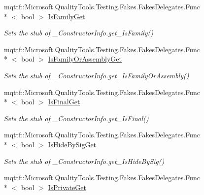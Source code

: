 \begin{DoxyCompactItemize}
mqttf\-::\-Microsoft.\-Quality\-Tools.\-Testing.\-Fakes.\-Fakes\-Delegates.\-Func\\*
$<$ bool $>$ \hyperlink{class_system_1_1_runtime_1_1_interop_services_1_1_fakes_1_1_stub___constructor_info_a9ee0365563e0af17c1c1f814badfc88d}{Is\-Family\-Get}
\begin{DoxyCompactList}\small\item\em Sets the stub of \-\_\-\-Constructor\-Info.\-get\-\_\-\-Is\-Family()\end{DoxyCompactList}\item 
mqttf\-::\-Microsoft.\-Quality\-Tools.\-Testing.\-Fakes.\-Fakes\-Delegates.\-Func\\*
$<$ bool $>$ \hyperlink{class_system_1_1_runtime_1_1_interop_services_1_1_fakes_1_1_stub___constructor_info_a1976c04db3bc42e131c55033d046c274}{Is\-Family\-Or\-Assembly\-Get}
\begin{DoxyCompactList}\small\item\em Sets the stub of \-\_\-\-Constructor\-Info.\-get\-\_\-\-Is\-Family\-Or\-Assembly()\end{DoxyCompactList}\item 
mqttf\-::\-Microsoft.\-Quality\-Tools.\-Testing.\-Fakes.\-Fakes\-Delegates.\-Func\\*
$<$ bool $>$ \hyperlink{class_system_1_1_runtime_1_1_interop_services_1_1_fakes_1_1_stub___constructor_info_a906f0c6c1a33694caf38fce03b3dd7f6}{Is\-Final\-Get}
\begin{DoxyCompactList}\small\item\em Sets the stub of \-\_\-\-Constructor\-Info.\-get\-\_\-\-Is\-Final()\end{DoxyCompactList}\item 
mqttf\-::\-Microsoft.\-Quality\-Tools.\-Testing.\-Fakes.\-Fakes\-Delegates.\-Func\\*
$<$ bool $>$ \hyperlink{class_system_1_1_runtime_1_1_interop_services_1_1_fakes_1_1_stub___constructor_info_a28e129ec0d4184141375fbabac96b86f}{Is\-Hide\-By\-Sig\-Get}
\begin{DoxyCompactList}\small\item\em Sets the stub of \-\_\-\-Constructor\-Info.\-get\-\_\-\-Is\-Hide\-By\-Sig()\end{DoxyCompactList}\item 
mqttf\-::\-Microsoft.\-Quality\-Tools.\-Testing.\-Fakes.\-Fakes\-Delegates.\-Func\\*
$<$ bool $>$ \hyperlink{class_system_1_1_runtime_1_1_interop_services_1_1_fakes_1_1_stub___constructor_info_a0fe48f594442d0bfd650b7041e523d1b}{Is\-Private\-Get}

\end{DoxyCompactItemize}
